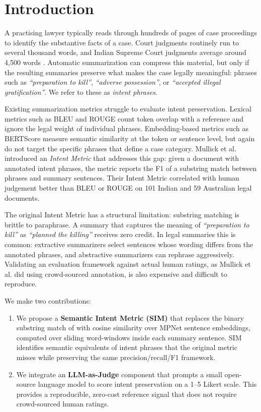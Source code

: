 \documentclass[conference,a4paper]{IEEEtran}
\begin{document}
\section{Introduction}

A practising lawyer typically reads through hundreds of pages of case proceedings to identify the substantive facts of a case. Court judgments routinely run to several thousand words, and Indian Supreme Court judgments average around 4{,}500 words \cite{mullick2022}. Automatic summarization can compress this material, but only if the resulting summaries preserve what makes the case legally meaningful: phrases such as \textit{``preparation to kill''}, \textit{``adverse possession''}, or \textit{``accepted illegal gratification''}. We refer to these as \textit{intent phrases}.

Existing summarization metrics struggle to evaluate intent preservation. Lexical metrics such as BLEU \cite{papineni2002bleu} and ROUGE \cite{lin2004rouge} count token overlap with a reference and ignore the legal weight of individual phrases. Embedding-based metrics such as BERTScore \cite{zhang2020bertscore} measure semantic similarity at the token or sentence level, but again do not target the specific phrases that define a case category. Mullick et al.~\cite{mullick2022} introduced an \textit{Intent Metric} that addresses this gap: given a document with annotated intent phrases, the metric reports the F1 of a substring match between phrases and summary sentences. Their Intent Metric correlated with human judgement better than BLEU or ROUGE on 101 Indian and 59 Australian legal documents.

The original Intent Metric has a structural limitation: substring matching is brittle to paraphrase. A summary that captures the meaning of \textit{``preparation to kill''} as \textit{``planned the killing''} receives zero credit. In legal summaries this is common: extractive summarizers select sentences whose wording differs from the annotated phrases, and abstractive summarizers can rephrase aggressively. Validating an evaluation framework against actual human ratings, as Mullick et al. did using crowd-sourced annotation, is also expensive and difficult to reproduce.

We make two contributions:

\begin{enumerate}
  \item We propose a \textbf{Semantic Intent Metric (SIM)} that replaces the binary substring match of \cite{mullick2022} with cosine similarity over MPNet \cite{song2020mpnet} sentence embeddings, computed over sliding word-windows inside each summary sentence. SIM identifies semantic equivalents of intent phrases that the original metric misses while preserving the same precision/recall/F1 framework.
  \item We integrate an \textbf{LLM-as-Judge} component \cite{liu2023geval, zheng2023judging} that prompts a small open-source language model to score intent preservation on a 1--5 Likert scale. This provides a reproducible, zero-cost reference signal that does not require crowd-sourced human ratings.
\end{enumerate}
\end{document}
